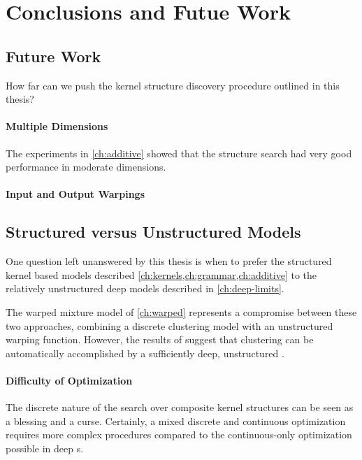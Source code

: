 
\inbpdocument

\chapter{Conclusions and Futue Work}
\label{ch:discussion}




\section{Future Work}

How far can we push the kernel structure discovery procedure outlined in this thesis?

\subsubsection{Multiple Dimensions}

The experiments in \cref{ch:additive} showed that the structure search had very good performance in moderate dimensions.

\subsubsection{Input and Output Warpings}


\section{Structured versus Unstructured \sgp{} Models}

One question left unanswered by this thesis is when to prefer the structured kernel based models described \cref{ch:kernels,ch:grammar,ch:additive} to the relatively unstructured deep \gp{} models described in \cref{ch:deep-limits}.

The warped mixture model of \cref{ch:warped} represents a compromise between these two approaches, combining a discrete clustering model with an unstructured warping function.
However, the results of \citet{damianou2012deep} suggest that clustering can be automatically accomplished by a sufficiently deep, unstructured \gp{}.

\subsubsection{Difficulty of Optimization}
The discrete nature of the search over composite kernel structures can be seen as a blessing and a curse.
Certainly, a mixed discrete and continuous optimization requires more complex procedures compared to the continuous-only optimization possible in deep \gp{}s.

